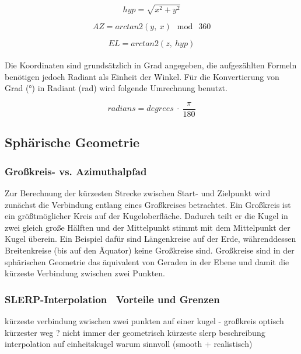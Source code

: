 \begin{equation}
    hyp = \sqrt{x^2 + y^2}
    \label{hypotenuse}
\end{equation}

\begin{equation}
    AZ = arctan2(y,~x)~ \bmod ~360
    \label{arctan2_az}
\end{equation}

\begin{equation}
    EL = arctan2(z,~hyp)
    \label{arctan2_el}
\end{equation}
\\
Die Koordinaten sind grundsätzlich in Grad angegeben, die aufgezählten Formeln benötigen jedoch Radiant als Einheit der Winkel.
Für die Konvertierung von Grad (°) in Radiant (rad) wird folgende Umrechnung benutzt.

\begin{equation}
    radians = degrees ~\cdot~ \frac{\pi}{180}
\end{equation}


\subsection{Sphärische Geometrie}

\subsubsection{Großkreis- vs. Azimuthalpfad}

Zur Berechnung der kürzesten Strecke zwischen Start- und Zielpunkt wird zunächst die Verbindung entlang eines Großkreises betrachtet. Ein Großkreis ist ein größtmöglicher Kreis auf der Kugeloberfläche. Dadurch teilt er die Kugel in zwei gleich große Hälften und der Mittelpunkt stimmt mit dem Mittelpunkt der Kugel überein. Ein Beispiel dafür sind Längenkreise auf der Erde, währenddessen Breitenkreise (bis auf den Äquator) keine Großkreise sind. Großkreise sind in der sphärischen Geometrie das äquivalent von Geraden in der Ebene und damit die kürzeste Verbindung zwischen zwei Punkten.

\subsubsection{SLERP-Interpolation \textendash~Vorteile und Grenzen}

kürzeste verbindung zwischen zwei punkten auf einer kugel - großkreis
optisch kürzester weg ? nicht immer der geometrisch kürzeste
slerp beschreibung
interpolation auf einheitskugel
warum sinnvoll (smooth + realistisch)






